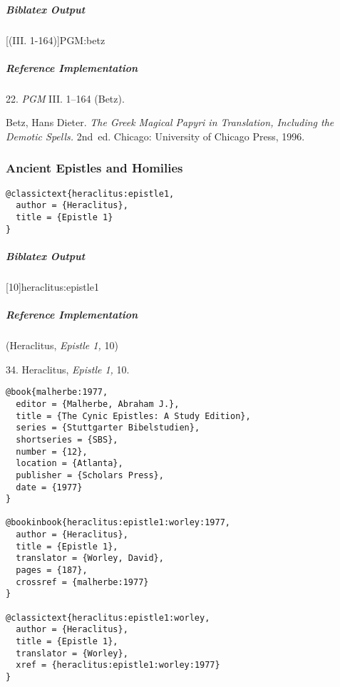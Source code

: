 \documentclass[a4paper]{article}
\newenvironment{biboutput}{%
  \subparagraph{Biblatex Output}
}{\color{black}}
\newenvironment{refimp}{%
  \subparagraph{Reference Implementation}
  \color{reference-colour}
  \rm
}{\par\color{black}}
\begin{document}
\begin{biboutput}
  [(III. 1-164)]{PGM:betz}
\end{biboutput}

\begin{refimp}
  \hspace*{\bibindent}22. \emph{PGM} III. 1–164 (Betz).

  \hangindent\bibindent Betz, Hans Dieter. \emph{The Greek Magical Papyri in
  Translation, Including the Demotic Spells.} 2nd~ed. Chicago: University of
  Chicago Press, 1996.

\end{refimp}

\subsubsection{Ancient Epistles and Homilies}

\begin{lstlisting}
@classictext{heraclitus:epistle1,
  author = {Heraclitus},
  title = {Epistle 1}
}
\end{lstlisting}

\begin{biboutput}
  [10]{heraclitus:epistle1}
\end{biboutput}

\begin{refimp}
  (Heraclitus, \emph{Epistle 1,} 10)

  \hspace*{\bibindent}34. Heraclitus, \emph{Epistle 1,} 10.
\end{refimp}

\begin{lstlisting}
@book{malherbe:1977,
  editor = {Malherbe, Abraham J.},
  title = {The Cynic Epistles: A Study Edition},
  series = {Stuttgarter Bibelstudien},
  shortseries = {SBS},
  number = {12},
  location = {Atlanta},
  publisher = {Scholars Press},
  date = {1977}
}

@bookinbook{heraclitus:epistle1:worley:1977,
  author = {Heraclitus},
  title = {Epistle 1},
  translator = {Worley, David},
  pages = {187},
  crossref = {malherbe:1977}
}

@classictext{heraclitus:epistle1:worley,
  author = {Heraclitus},
  title = {Epistle 1},
  translator = {Worley},
  xref = {heraclitus:epistle1:worley:1977}
}
\end{lstlisting}
\end{document}
